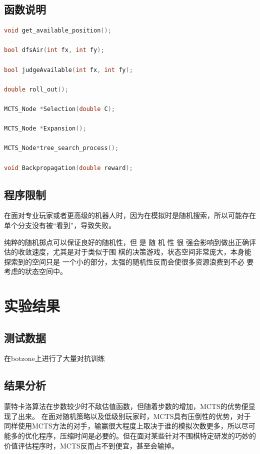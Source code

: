 \documentclass{ctexrep}
\begin{document}
\section{函数说明}

\begin{lstlisting}[language=C++]
void get_available_position();

bool dfsAir(int fx, int fy);

bool judgeAvailable(int fx, int fy);

double roll_out();

MCTS_Node *Selection(double C);  

MCTS_Node *Expansion();

MCTS_Node*tree_search_process();

void Backpropagation(double reward);
\end{lstlisting}
\section{程序限制}
在面对专业玩家或者更高级的机器人时，因为在模拟时是随机搜索，所以可能存在单个分支没有被“看到”，导致失败。

纯粹的随机掷点可以保证良好的随机性，但 是 随 机 性 很
强会影响到做出正确评估的收敛速度，尤其是对于类似于围
棋的决策游戏，状态空间非常庞大，本身能探索到的空间只是
一个小的部分，太强的随机性反而会使很多资源浪费到不必
要考虑的状态空间中。

\chapter{实验结果}



\section{测试数据}
在botzone上进行了大量对抗训练


\section{结果分析}
蒙特卡洛算法在步数较少时不敌估值函数，但随着步数的增加，MCTS的优势便显现了出来。
在面对随机策略以及低级别玩家时，MCTS具有压倒性的优势，对于同样使用MCTS方法的对手，输赢很大程度上取决于谁的模拟次数更多，所以尽可能多的优化程序，压缩时间是必要的。但在面对某些针对不围棋特定研发的巧妙的价值评估程序时，MCTS反而占不到便宜，甚至会输掉。
\end{document}
